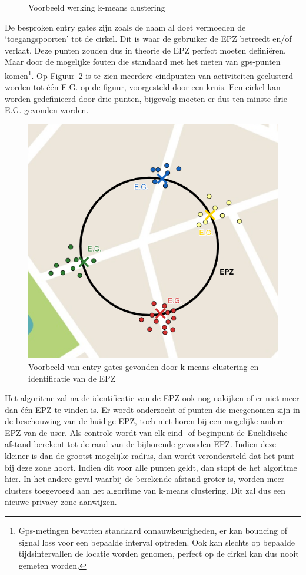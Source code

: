 \begin{figure}[h]
\begin{subfigure}[b]{.33\textwidth}
    \end{subfigure}
    \caption{Voorbeeld werking k-means clustering~\cite{InDepthk59:online}}\label{fig:kmeans}
\end{figure}

De besproken entry gates zijn zoals de naam al doet vermoeden de
`toegangspoorten' tot de cirkel. Dit is waar de gebruiker de \ac{EPZ} betreedt
en/of verlaat. Deze punten zouden dus in theorie de \ac{EPZ} perfect moeten
definiëren. Maar door de mogelijke fouten die standaard met het meten van
gps-punten komen\footnote{Gps-metingen bevatten standaard onnauwkeurigheden, er
    kan bouncing of signal loss voor een bepaalde interval optreden. Ook kan
    slechts op bepaalde tijdsintervallen de locatie worden genomen, perfect op de
    cirkel kan dus nooit gemeten worden.}. Op Figuur~\ref{fig:entrygate} is te zien
meerdere eindpunten van activiteiten geclusterd worden tot één \ac{E.G.} op de
figuur, voorgesteld door een kruis. Een cirkel kan worden gedefinieerd door
drie punten, bijgevolg moeten er dus ten minste drie \ac{E.G.} gevonden worden.
\begin{figure}
    \centering
    \includegraphics[width=0.5\linewidth]{fig/EPZ-mechanisme/Entry_Gate.png}
    \caption{Voorbeeld van entry gates gevonden door k-means clustering en identificatie van de \ac{EPZ}}\label{fig:entrygate}
\end{figure}

Het algoritme zal na de identificatie van de \ac{EPZ} ook nog nakijken of er
niet meer dan één \ac{EPZ} te vinden is. Er wordt onderzocht of punten die
meegenomen zijn in de beschouwing van de huidige \ac{EPZ}, toch niet horen bij
een mogelijke andere \ac{EPZ} van de user. Als controle wordt van elk eind- of
beginpunt de Euclidische afstand berekent tot de rand van de bijhorende
gevonden \ac{EPZ}. Indien deze kleiner is dan de grootst mogelijke radius, dan
wordt verondersteld dat het punt bij deze zone hoort. Indien dit voor alle
punten geldt, dan stopt de het algoritme hier. In het andere geval waarbij de
berekende afstand groter is, worden meer clusters toegevoegd aan het algoritme
van k-means clustering. Dit zal dus een nieuwe privacy zone aanwijzen.


